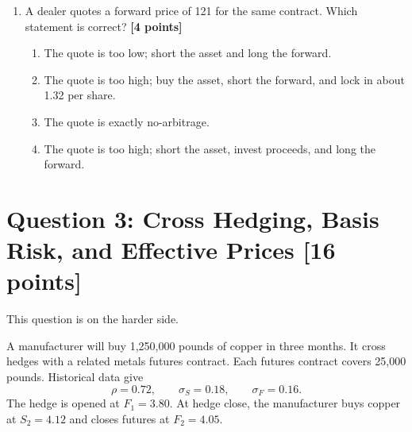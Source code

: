 \documentclass[11pt]{article}
\newcommand{\pts}[1]{\hspace{0.35em}\textnormal{\textbf{[#1 points]}}}
\newenvironment{choices}{\begin{enumerate}[label=\Alph*.,leftmargin=2.2em,itemsep=0.12em,topsep=0.12em]}{\end{enumerate}}
\begin{document}
\begin{enumerate}
    \item A dealer quotes a forward price of 121 for the same contract. Which
    statement is correct? \pts{4}
    \begin{choices}
        \item The quote is too low; short the asset and long the forward.
        \item The quote is too high; buy the asset, short the forward, and lock
        in about 1.32 per share.
        \item The quote is exactly no-arbitrage.
        \item The quote is too high; short the asset, invest proceeds, and long
        the forward.
    \end{choices}
\end{enumerate}

\section*{Question 3: Cross Hedging, Basis Risk, and Effective Prices \pts{16}}

This question is on the harder side.

A manufacturer will buy 1,250,000 pounds of copper in three months. It cross
hedges with a related metals futures contract. Each futures contract covers
25,000 pounds. Historical data give
\[
    \rho=0.72,\qquad \sigma_S=0.18,\qquad \sigma_F=0.16.
\]
The hedge is opened at $F_1=3.80$. At hedge close, the manufacturer buys copper
at $S_2=4.12$ and closes futures at $F_2=4.05$.
\end{document}
